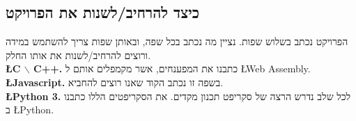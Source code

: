 \documentclass{article}
\begin{document}
	\subsection{כיצד להרחיב/לשנות את הפרויקט} 
	
	הפרויקט נכתב בשלוש שפות. נציין מה נכתב בכל שפה, ובאותן שפות צריך להשתמש במידה ורוצים להרחיב/לשנות את אותו החלק. \\ 
	\textbf{\L{C $\backslash$ C++}.} 
	כתבנו את המפענחים, אשר מקמפלים אותם ל 
	\L{Web Assembly}.\\ 
	\textbf{\L{Javascript}.} 
	בשפה זו נכתב הקוד שאנו רוצים להחביא. \\ 
	\textbf{\L{Python 3}.} 
	לכל שלב נדרש הרצה של סקריפט תכנון מקדים. את הסקריפטים הללו כתבנו ב 
	\L{Python}. 
\end{document}

